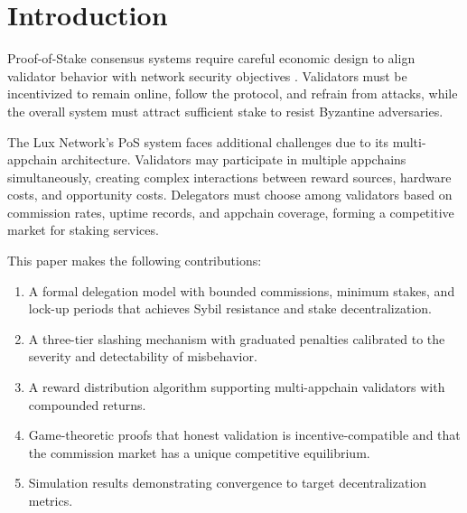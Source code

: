 \section{Introduction}


Proof-of-Stake consensus systems require careful economic design to align validator behavior with network security objectives \cite{saleh2021blockchain, kiayias2017ouroboros}. Validators must be incentivized to remain online, follow the protocol, and refrain from attacks, while the overall system must attract sufficient stake to resist Byzantine adversaries.

The Lux Network's PoS system faces additional challenges due to its multi-appchain architecture. Validators may participate in multiple appchains simultaneously, creating complex interactions between reward sources, hardware costs, and opportunity costs. Delegators must choose among validators based on commission rates, uptime records, and appchain coverage, forming a competitive market for staking services.

This paper makes the following contributions:

\begin{enumerate}[label=(\roman*)]
    \item A formal delegation model with bounded commissions, minimum stakes, and lock-up periods that achieves Sybil resistance and stake decentralization.
    \item A three-tier slashing mechanism with graduated penalties calibrated to the severity and detectability of misbehavior.
    \item A reward distribution algorithm supporting multi-appchain validators with compounded returns.
    \item Game-theoretic proofs that honest validation is incentive-compatible and that the commission market has a unique competitive equilibrium.
    \item Simulation results demonstrating convergence to target decentralization metrics.
\end{enumerate}

